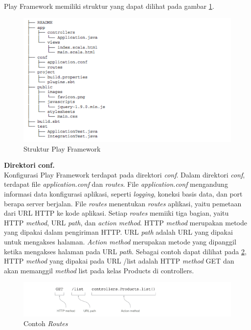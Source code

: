 \documentclass[a4paper,twoside]{article}
\begin{document}
\begin{enumerate}
Play Framework memiliki struktur yang dapat dilihat pada gambar \ref{fig:2_play_struktur}.

\begin{figure}[H]
  \centering
  \includegraphics[scale=0.7]{Gambar/play-struktur}
  \caption{Struktur Play Framework} 
  \label{fig:2_play_struktur}
\end{figure}

\textbf{Direktori conf.}\\
Konfigurasi Play Framework terdapat pada direktori \textit{conf}. Dalam direktori \textit{conf}, terdapat file \textit{application.conf} dan \textit{routes}. File \textit{application.conf} mengandung informasi data konfigurasi aplikasi, seperti \textit{logging}, koneksi basis data, dan port berapa server berjalan. File \textit{routes} menentukan \textit{routes} aplikasi, yaitu pemetaan dari URL HTTP ke kode aplikasi. Setiap \textit{routes} memiiki tiga bagian, yaitu HTTP \textit{method}, URL \textit{path}, dan \textit{action method}. HTTP \textit{method} merupakan metode yang dipakai dalam pengiriman HTTP. URL \textit{path} adalah URL yang dipakai untuk mengakses halaman. \textit{Action method} merupakan metode  yang dipanggil ketika mengakses halaman pada URL \textit{path}. Sebagai contoh dapat dilihat pada \ref{fig:2_play_routes}, HTTP \textit{method} yang dipakai pada URL /list adalah HTTP \textit{method} GET dan akan memanggil \textit{method} list pada kelas Products di controllers.

\begin{figure}[H]
  \centering
  \includegraphics[scale=0.7]{Gambar/play-routes}
  \caption{Contoh \textit{Routes}} 
  \label{fig:2_play_routes}
\end{figure}


\end{enumerate}
\end{document}
